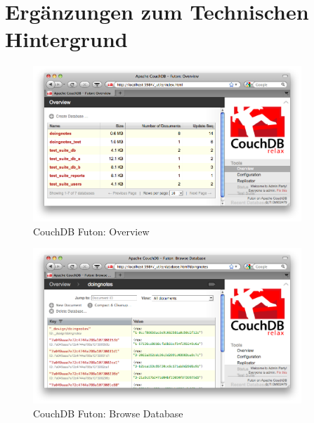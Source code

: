 \section{Ergänzungen zum Technischen Hintergrund}

\begin{figure}[H] 
  \begin{center}
    \includegraphics[width=0.9\textwidth]{grafik/futon-overview} 
  \end{center}
  \caption{CouchDB Futon: Overview}
  \label{fig:futon-overview} 
\end{figure}

\begin{figure}[H] 
  \begin{center}
    \includegraphics[width=0.9\textwidth]{grafik/futon-browse-db} 
  \end{center}
  \caption{CouchDB Futon: Browse Database}
  \label{fig:futon-browse-db} 
\end{figure}

